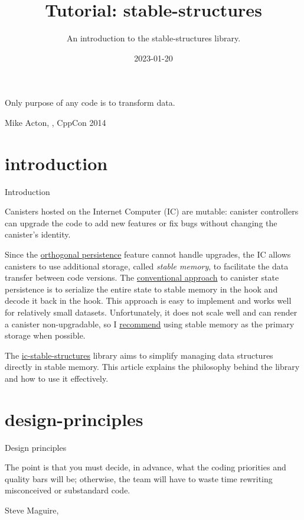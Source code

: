 \documentclass{article}
\title{Tutorial: stable-structures}
\subtitle{An introduction to the stable-structures library.}
\date{2023-01-20}
\begin{document}
\epigraph{
  Only purpose of any code is to transform data.
}{Mike Acton, \href{https://youtu.be/rX0ItVEVjHc?t=1360}{\cite{Data-Oriented Design and C++}}, CppCon 2014}

\section{introduction}{Introduction}

Canisters hosted on the Internet Computer (IC) are mutable: canister controllers can upgrade the code to add new features or fix bugs without changing the canister's identity.

Since the \href{/posts/06-ic-orthogonal-persistence.html#upgrades}{orthogonal persistence} feature cannot handle upgrades, the IC allows canisters to use additional storage, called \emph{stable memory}, to facilitate the data transfer between code versions.
The \href{/posts/11-ii-stable-memory.html#conventional-memory-management}{conventional approach} to canister state persistence is to serialize the entire state to stable memory in the  hook and decode it back in the  hook.
This approach is easy to implement and works well for relatively small datasets.
Unfortunately, it does not scale well and can render a canister non-upgradable, so I \href{/posts/01-effective-rust-canisters.html#stable-memory-main}{recommend} using stable memory as the primary storage when possible.


The \href{https://github.com/dfinity/stable-structures}{ic-stable-structures} library aims to simplify managing data structures directly in stable memory.
This article explains the philosophy behind the library and how to use it effectively.

\section{design-principles}{Design principles}
\epigraph{
    The point is that you must decide, in advance, what the coding priorities and quality bars will be; otherwise, the team will have to waste time rewriting misconceived or substandard code.
}{Steve Maguire, \cite{Debugging the Development Process, p. 19}}
\end{document}
